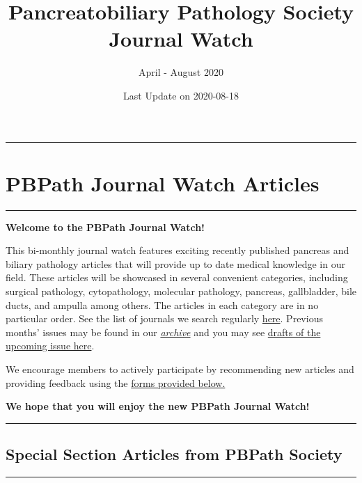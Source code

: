 \documentclass[
]{article}
\title{Pancreatobiliary Pathology Society Journal Watch}
\subtitle{April - August 2020}
\author{}
\date{\vspace{-2.5em}Last Update on 2020-08-18}
\begin{document}
\maketitle

{
\setcounter{tocdepth}{2}
\tableofcontents
}
\begin{center}\rule{0.5\linewidth}{0.5pt}\end{center}

\hypertarget{pbpath_jw}{%
\section{PBPath Journal Watch Articles}\label{pbpath_jw}}

\begin{center}\rule{0.5\linewidth}{0.5pt}\end{center}

\textbf{Welcome to the PBPath Journal Watch!}

This bi-monthly journal watch features exciting recently published
pancreas and biliary pathology articles that will provide up to date
medical knowledge in our field. These articles will be showcased in
several convenient categories, including surgical pathology,
cytopathology, molecular pathology, pancreas, gallbladder, bile ducts,
and ampulla among others. The articles in each category are in no
particular order. See the list of journals we search regularly
\href{http://pbpath.org/pbpath-journal-watch/}{here}. Previous months'
issues may be found in our
\emph{\href{http://pbpath.org/journal-watch-archive/}{archive}} and you
may see \href{http://pbpath.org/journal-watch-upcoming-issue/}{drafts of
the upcoming issue here}.

We encourage members to actively participate by recommending new
articles and providing feedback using the
\protect\hyperlink{feedback}{forms provided below.}

\textbf{We hope that you will enjoy the new PBPath Journal Watch!}

\pagebreak

\begin{center}\rule{0.5\linewidth}{0.5pt}\end{center}

\hypertarget{special}{%
\subsection{Special Section Articles from PBPath
Society}\label{special}}

\begin{center}\rule{0.5\linewidth}{0.5pt}\end{center}
\end{document}
